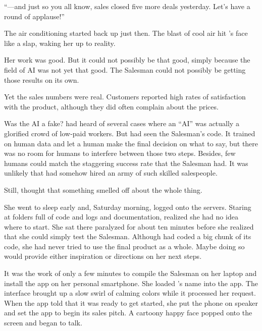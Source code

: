 ``---and just so you all know, sales closed five more deals yesterday. Let's have a round of applause!''

The air conditioning started back up just then. The blast of cool air hit {\protag}'s face like a slap, waking her up to reality.

Her work was good. But it could not possibly be that good, simply because the field of AI was not yet that good. The Salesman could not possibly be getting those results on its own.

Yet the sales numbers were real. Customers reported high rates of satisfaction with the product, although they did often complain about the prices.


Was the AI a fake? {\protag} had heard of several cases where an ``AI'' was actually a glorified crowd of low-paid workers. But {\protag} had seen the Salesman's code. It trained on human data and let a human make the final decision on what to say, but there was no room for humans to interfere between those two steps. Besides, few humans could match the staggering success rate that the Salesman had. It was unlikely that \energyCompany{} had somehow hired an army of such skilled salespeople.

Still, {\protag} thought that something smelled off about the whole thing.

She went to sleep early and, Saturday morning, logged onto the servers. Staring at folders full of code and logs and documentation, {\protag} realized she had no idea where to start.  She sat there paralyzed for about ten minutes before she realized that she could simply test the Salesman. Although {\protag} had coded a big chunk of its code, she had never tried to use the final product as a whole. Maybe doing so would provide either inspiration or directions on her next steps.

It was the work of only a few minutes to compile the Salesman on her laptop and install the app on her personal smartphone. She loaded {\sidetag}'s name into the app. The interface brought up a slow swirl of calming colors while it processed her request. When the app told {\protag} that it was ready to get started, she put the phone on speaker and set the app to begin its sales pitch. A cartoony happy face popped onto the screen and began to talk.

